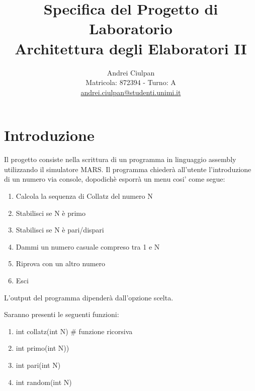 \documentclass[11pt]{article}
\title{Specifica del Progetto di Laboratorio \\ Architettura degli Elaboratori II}
\author{Andrei Ciulpan\\ Matricola: 872394 - Turno: A\\ \url{andrei.ciulpan@studenti.unimi.it}}
\date{}
\begin{document}
\maketitle

\section{Introduzione}

Il progetto consiste nella scrittura di un programma in linguaggio assembly utilizzando il simulatore MARS.
Il programma chiederà all'utente l'introduzione di un numero via console, dopodichè
esporrà un menu cosi' come segue:

\begin{enumerate}
\item Calcola la sequenza di Collatz del numero N
\item Stabilisci se N è primo 
\item Stabilisci se N è pari/dispari 
\item Dammi un numero casuale compreso tra 1 e N
\item Riprova con un altro numero
\item Esci
\end{enumerate}


L'output del programma dipenderà dall'opzione scelta.

Saranno presenti le seguenti funzioni:  

\begin{enumerate}
\item int collatz(int N) \# funzione ricorsiva
\item int primo(int N))
\item int pari(int N)
\item int random(int N)

\end{enumerate}
\end{document}

